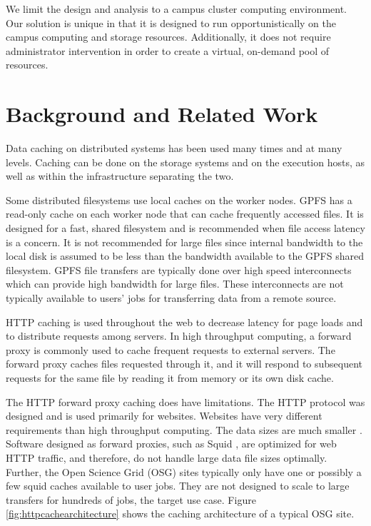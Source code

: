  


We limit the design and analysis to a campus cluster computing environment.  Our solution is unique in that it is designed to run opportunistically on the campus computing and storage resources.  Additionally, it does not require administrator intervention in order to create a virtual, on-demand pool of resources.


\section{Background and Related Work}


Data caching on distributed systems has been used many times and at many levels.  Caching can be done on the storage systems and on the execution hosts, as well as within the infrastructure separating the two.

Some distributed filesystems use local caches on the worker nodes.  GPFS \cite{schmuck2002gpfs} has a read-only cache on each worker node that can cache frequently accessed files.  It is designed for a fast, shared filesystem and is recommended when file access latency is a concern.  It is not recommended for large files since internal bandwidth to the local disk is assumed to be less than the bandwidth available to the GPFS shared filesystem.  GPFS file transfers are typically done over high speed interconnects which can provide high bandwidth for large files.  These interconnects are not typically available to users' jobs for transferring data from a remote source.


HTTP caching is used throughout the web to decrease latency for page loads and to distribute requests among servers.  In high throughput computing, a forward proxy is commonly used to cache frequent requests to external servers.  The forward proxy caches files requested through it, and it will respond to subsequent requests for the same file by reading it from memory or its own disk cache.

The HTTP forward proxy caching does have limitations.  The HTTP protocol was designed and is used primarily for websites.  Websites have very different requirements than high throughput computing.  The data sizes are much smaller \cite{websitesize}.  Software designed as forward proxies, such as Squid \cite{squidcacheurl}, are optimized for web HTTP traffic, and therefore, do not handle large data file sizes optimally.  Further, the Open Science Grid (OSG) \cite{pordes2007open} sites typically only have one or possibly a few squid caches available to user jobs.  They are not designed to scale to large transfers for hundreds of jobs, the target use case.  Figure \ref{fig:httpcachearchitecture} shows the caching architecture of a typical OSG site.

